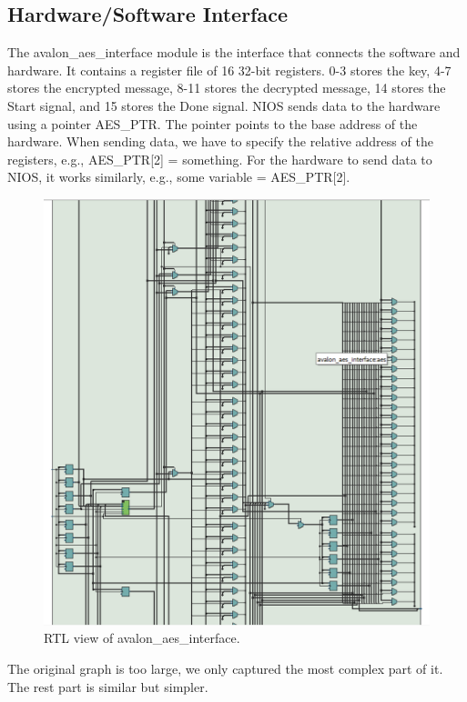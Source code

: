 \documentclass[12pt]{article}
\begin{document}
\subsection{Hardware/Software Interface}
The avalon\_aes\_interface module is the interface that connects the software and hardware. It contains a register file of 16 32-bit registers. 0-3 stores the key, 4-7 stores the encrypted message, 8-11 stores the decrypted message, 14 stores the Start signal, and 15 stores the Done signal. NIOS sends data to the hardware using a pointer AES\_PTR. The pointer points to the base address of the hardware. When sending data, we have to specify the relative address of the registers, e.g., AES\_PTR[2] = something. For the hardware to send data to NIOS, it works similarly, e.g., some variable = AES\_PTR[2]. 
\begin{figure}[H]
    \centering
    \includegraphics[width=15cm]{interface.png}
    \caption{RTL view of avalon\_aes\_interface.}
\end{figure}
The original graph is too large, we only captured the most complex part of it. The rest part is similar but simpler.
\end{document}
